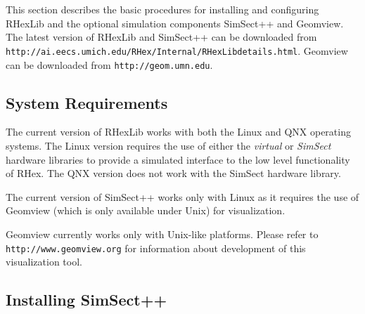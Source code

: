 This section describes the basic procedures for installing and configuring
RHexLib and the optional simulation components SimSect++ and Geomview. The
latest version of RHexLib and SimSect++ can be downloaded from {\tt
http://ai.eecs.umich.edu/RHex/Internal/RHexLibdetails.html}. Geomview can be
downloaded from {\tt http://geom.umn.edu}.

\subsection{System Requirements}

The current version of RHexLib works with both the Linux and QNX operating
systems. The Linux version requires the use of either the {\em virtual} or
{\em SimSect} hardware libraries to provide a simulated interface to the low
level functionality of RHex. The QNX version does not work with the SimSect
hardware library.

The current version of SimSect++ works only with Linux as it requires the
use of Geomview (which is only available under Unix) for visualization.

Geomview currently works only with Unix-like platforms. Please refer to {\tt
http://www.geomview.org} for information about development of this
visualization tool.

\subsection{Installing SimSect++}

